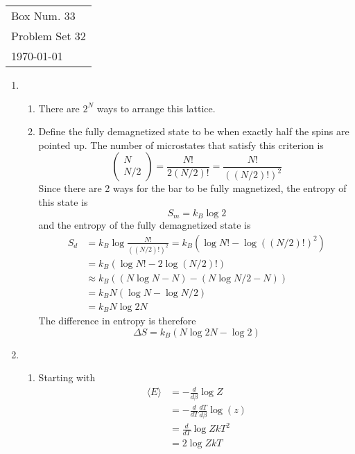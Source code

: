 \documentclass[10pt]{article}
\begin{document}
  \begin{tabular}{l}
    Box Num. 33 \\
    Problem Set 32 \\
    \today
  \end{tabular}

  \begin{enumerate}
    \item \begin{enumerate}
        \item There are $2^N$ ways to arrange this lattice.

        \item Define the fully demagnetized state to be when exactly half the spins are pointed up. The number of microstates that satisfy this criterion is
        \begin{equation*}
            \begin{pmatrix}N \\ N/2 \end{pmatrix} = \frac{N!}{2(N/2)!} = \frac{N!}{((N/2)!)^2}
        \end{equation*}
        Since there are 2 ways for the bar to be fully magnetized, the entropy of this state is
        \begin{equation*}
            S_{m} = k_B \log 2
        \end{equation*}
        and the entropy of the fully demagnetized state is
        \begin{align*}
            S_{d} &= k_B \log \frac{N!}{((N/2)!)^2} = k_B \left(\log N! - \log ((N/2)!)^2 \right) \\
            &= k_B \left(\log N! - 2\log (N/2)!\right) \\
            &\approx k_B \left(
                (N \log N - N) - (N \log N/2 - N)
            \right) \\
            &= k_B N (\log N - \log N/2) \\
            &= k_B N \log 2 N
        \end{align*}
        The difference in entropy is therefore
        \begin{equation*}
            \Delta S = k_B (N \log 2 N - \log 2)
        \end{equation*}
    \end{enumerate}

    \item \begin{enumerate}
        \item Starting with
        \begin{align*}
            \langle E \rangle &= -\frac{d}{d\beta}\log Z \\
            &= -\frac{d}{dT} \frac{dT}{d\beta} \log(z) \\
            &= \frac{d}{dT} \log Z k T^2 \\
            &= 2\log Z kT
        \end{align*}
    \end{enumerate}


\end{enumerate}
\end{document}
